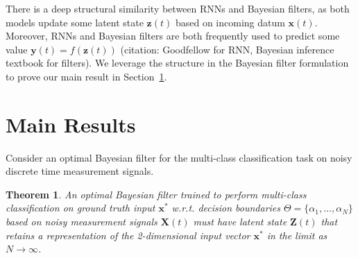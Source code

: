 \documentclass[12pt]{article}
\newtheorem{theorem}{Theorem}
\begin{document}
There is a deep structural similarity between RNNs and Bayesian filters, as
both models update some latent state $\mathbf z(t)$ based on incoming datum
$\mathbf x(t)$. 
Moreover, RNNs and Bayesian filters are both frequently used to predict some
value $\mathbf y(t) = f(\mathbf z(t))$ (citation: Goodfellow for RNN, Bayesian
inference textbook for filters).
We leverage the structure in the Bayesian filter formulation to prove our main
result in Section~\ref{sec:main}. 



\section{Main Results}
\label{sec:main}

Consider an optimal Bayesian filter for the multi-class classification task on 
noisy discrete time measurement signals. 



\begin{theorem}
	\label{thm:main}
	An optimal Bayesian filter trained to perform multi-class classification on
	ground truth input $\mathbf x^*$ w.r.t. decision boundaries 
	$\Theta = \{\alpha_1, \dots, \alpha_N\}$ based on noisy measurement signals
	$\mathbf X(t)$ must have latent state $\mathbf Z(t)$ that retains a
	representation of the 2-dimensional input vector $\mathbf x^*$ in the limit 
	as $N \to \infty$. 
\end{theorem}
\end{document}
